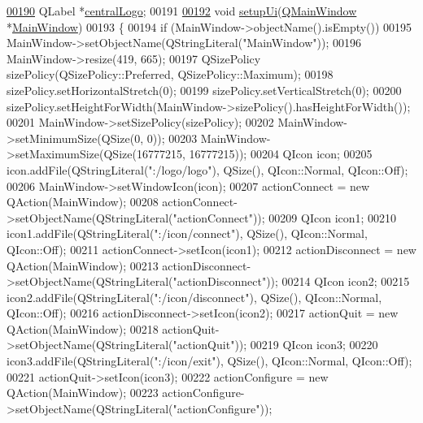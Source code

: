 \begin{DoxyCode}
\hypertarget{a00139_source_l00190}{}\hyperlink{a00080_ab5c037236f041a2a7753d3e4efd3d0e8}{00190}     QLabel *\hyperlink{a00080_ab5c037236f041a2a7753d3e4efd3d0e8}{centralLogo};
00191 
\hypertarget{a00139_source_l00192}{}\hyperlink{a00080_acf4a0872c4c77d8f43a2ec66ed849b58}{00192}     \textcolor{keywordtype}{void} \hyperlink{a00080_acf4a0872c4c77d8f43a2ec66ed849b58}{setupUi}(\hyperlink{a00058}{QMainWindow} *\hyperlink{a00017}{MainWindow})
00193     \{
00194         \textcolor{keywordflow}{if} (MainWindow->objectName().isEmpty())
00195             MainWindow->setObjectName(QStringLiteral(\textcolor{stringliteral}{"MainWindow"}));
00196         MainWindow->resize(419, 665);
00197         QSizePolicy sizePolicy(QSizePolicy::Preferred, QSizePolicy::Maximum);
00198         sizePolicy.setHorizontalStretch(0);
00199         sizePolicy.setVerticalStretch(0);
00200         sizePolicy.setHeightForWidth(MainWindow->sizePolicy().hasHeightForWidth());
00201         MainWindow->setSizePolicy(sizePolicy);
00202         MainWindow->setMinimumSize(QSize(0, 0));
00203         MainWindow->setMaximumSize(QSize(16777215, 16777215));
00204         QIcon icon;
00205         icon.addFile(QStringLiteral(\textcolor{stringliteral}{":/logo/logo"}), QSize(), QIcon::Normal, QIcon::Off);
00206         MainWindow->setWindowIcon(icon);
00207         actionConnect = \textcolor{keyword}{new} QAction(MainWindow);
00208         actionConnect->setObjectName(QStringLiteral(\textcolor{stringliteral}{"actionConnect"}));
00209         QIcon icon1;
00210         icon1.addFile(QStringLiteral(\textcolor{stringliteral}{":/icon/connect"}), QSize(), QIcon::Normal, QIcon::Off);
00211         actionConnect->setIcon(icon1);
00212         actionDisconnect = \textcolor{keyword}{new} QAction(MainWindow);
00213         actionDisconnect->setObjectName(QStringLiteral(\textcolor{stringliteral}{"actionDisconnect"}));
00214         QIcon icon2;
00215         icon2.addFile(QStringLiteral(\textcolor{stringliteral}{":/icon/disconnect"}), QSize(), QIcon::Normal, QIcon::Off);
00216         actionDisconnect->setIcon(icon2);
00217         actionQuit = \textcolor{keyword}{new} QAction(MainWindow);
00218         actionQuit->setObjectName(QStringLiteral(\textcolor{stringliteral}{"actionQuit"}));
00219         QIcon icon3;
00220         icon3.addFile(QStringLiteral(\textcolor{stringliteral}{":/icon/exit"}), QSize(), QIcon::Normal, QIcon::Off);
00221         actionQuit->setIcon(icon3);
00222         actionConfigure = \textcolor{keyword}{new} QAction(MainWindow);
00223         actionConfigure->setObjectName(QStringLiteral(\textcolor{stringliteral}{"actionConfigure"}));

\end{DoxyCode}
